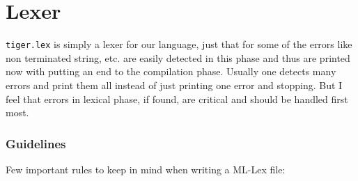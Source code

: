 \section{Lexer}


\texttt{tiger.lex} is simply a lexer for our language, just that for some of the errors like non terminated string, etc. are easily detected in this phase and thus are printed now with putting an end to the compilation phase. Usually one detects many errors and print them all instead of just printing one error and stopping. But I feel that errors in lexical phase, if found, are critical and should be handled first most. 

\subsubsection{Guidelines}

Few important rules to keep in mind when writing a ML-Lex file:


